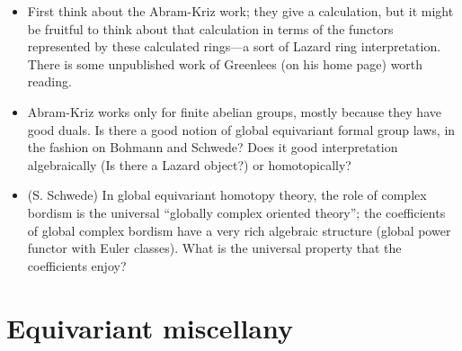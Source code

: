 \documentclass[12pt,titlepage]{article}
\theoremstyle{plain}
\theoremstyle{definition}
\theoremstyle{remark}
\begin{document}
\begin{itemize}
\begin{itemize}%
\item First think about the Abram-Kriz work; they give a calculation, but it might be fruitful to think about that calculation in terms of the functors represented by these calculated rings---{}a sort of Lazard ring interpretation. There is some unpublished work of Greenlees (on his home page) worth reading.


\item Abram-Kriz works only for finite abelian groups, mostly because they have good duals. Is there a good notion of global equivariant formal group laws, in the fashion on Bohmann and Schwede? Does it good interpretation algebraically (Is there a Lazard object?) or homotopically?


\item (S. Schwede) In global equivariant homotopy theory, the role of complex bordism is the universal ``{}globally complex oriented theory''{}; the coefficients of global complex bordism have a very rich algebraic structure (global power functor with Euler classes). What is the universal property that the coefficients enjoy?



\end{itemize}


\end{itemize}
\section{Equivariant miscellany}
\end{document}
